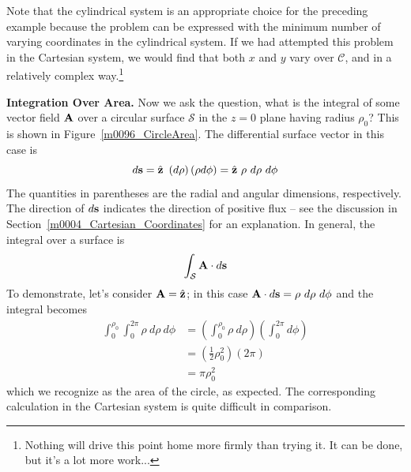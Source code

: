 Note that the cylindrical system is an appropriate choice for the preceding example because the problem can be expressed with the minimum number of varying coordinates in the cylindrical system.
If we had attempted this problem in the Cartesian system, we would find that both $x$ and $y$ vary over ${\mathcal C}$, and in a relatively complex way.\footnote{Nothing will drive this point home more firmly than trying it.  It can be done, but it's a lot more work...}

{\bf Integration Over Area.}  
Now we ask the question, what is the integral of some vector field ${\bf A}$ over a circular surface ${\mathcal S}$ in the $z=0$ plane having radius $\rho_0$? 
This is shown in Figure~\ref{m0096_CircleArea}.
The differential surface vector in this case is
%
\begin{equation}
d{\bf s} = \hat{\bf z}~\left( d\rho \right) \left( \rho d\phi \right) = \hat{\bf z}~\rho~d\rho~d\phi  
\end{equation}
%
The quantities in parentheses are the radial and angular dimensions, respectively.
The direction of $d{\bf s}$ indicates the direction of positive flux 
-- see the discussion in Section~\ref{m0004_Cartesian_Coordinates} for an explanation.  
In general, the integral over a surface is
%
\begin{equation}
\int_{\mathcal S} {\bf A}\cdot d{\bf s}
\end{equation}
%
To demonstrate, let's consider ${\bf A}=\hat{\bf z}$; in this case ${\bf A}\cdot d{\bf s} = \rho~d\rho~d\phi$ and the integral becomes
%
\begin{equation}
\begin{split}
\int_{0}^{\rho_0}\int_{0}^{2\pi} \rho~d\rho~d\phi &= \left( \int_{0}^{\rho_0} \rho~d\rho \right) \left( \int_{0}^{2\pi} d\phi \right) \\
                                                  &= \left( \frac{1}{2}\rho_0^2 \right) \left( 2\pi \right) \\
                                                  &= \pi \rho_0^2
\end{split}
\end{equation}
%
which we recognize as the area of the circle, as expected.
The corresponding calculation in the Cartesian system is quite difficult in comparison.
%

